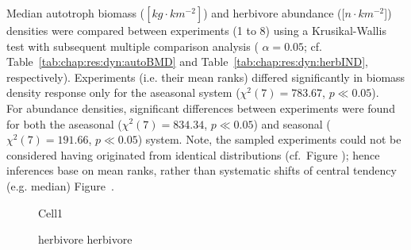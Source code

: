 Median autotroph biomass ($[kg\cdot km^{-2}]$) and herbivore abundance ($[n\cdot km^{-2}$]) densities were compared between experiments (1 to 8) using a Krusikal-Wallis test with subsequent multiple comparison analysis ( $\alpha = 0.05$; cf. Table~\ref{tab:chap:res:dyn:autoBMD} and Table~\ref{tab:chap:res:dyn:herbIND}, respectively). 
Experiments (i.e. their mean ranks) differed significantly in biomass density response only for the aseasonal  system ($\chi^{2}(7) = 783.67$, $p \ll 0.05$). 
\\
For abundance densities, significant differences between experiments were found for both the aseasonal ($\chi^{2}(7) = 834.34$, $p \ll 0.05$) and seasonal ($\chi^{2}(7) = 191.66$, $p \ll 0.05$) system. 
Note, the sampled experiments could not be considered having originated from identical distributions (cf.~Figure ); 
hence inferences base on mean ranks, rather than systematic shifts of central tendency (e.g. median) Figure~.




\begin{figure}
\centering

\caption[Average body mass (seasonal system)]{Cell1}
\label{fig:chap:res:dyn:cell1:avg}
\end{figure}


%




\begin{figure}
\centering

\caption[Effect of carnivore group composition on herbivore biomass and abundance density]{herbivore herbivore}
\label{fig:chap:res:dyn:compherb}
\end{figure}




%
%